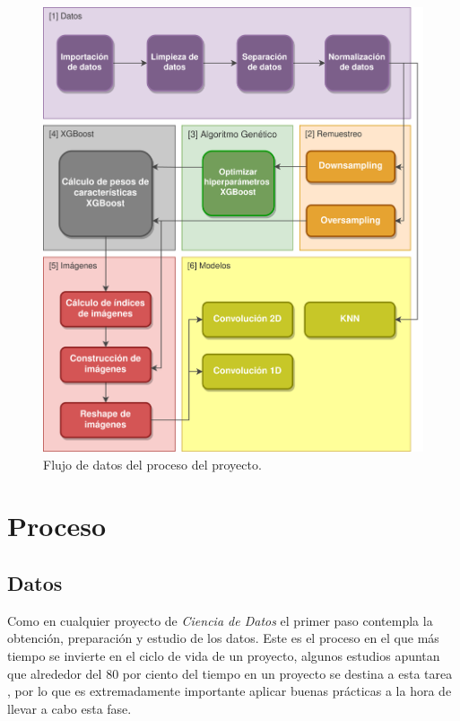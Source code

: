     \begin{figure}[H]
        \centering
        \includegraphics[width=15cm]{archivos/4.Metodologia/DataflowImageESP}
        \caption{Flujo de datos del proceso del proyecto.}
        \label{DataflowImage}
    \end{figure}


\section{Proceso}



    \subsection{Datos}


            Como en cualquier proyecto de \textit{Ciencia de Datos} el primer paso contempla la obtención, preparación y estudio de los datos. Este es el proceso en el que más tiempo se invierte en el ciclo de vida de un proyecto, algunos estudios apuntan que alrededor del 80 por ciento del tiempo en un proyecto se destina a esta tarea \cite{LifecycleDataScienceProjectsTimes}, por lo que es extremadamente importante aplicar buenas prácticas a la hora de llevar a cabo esta fase.

